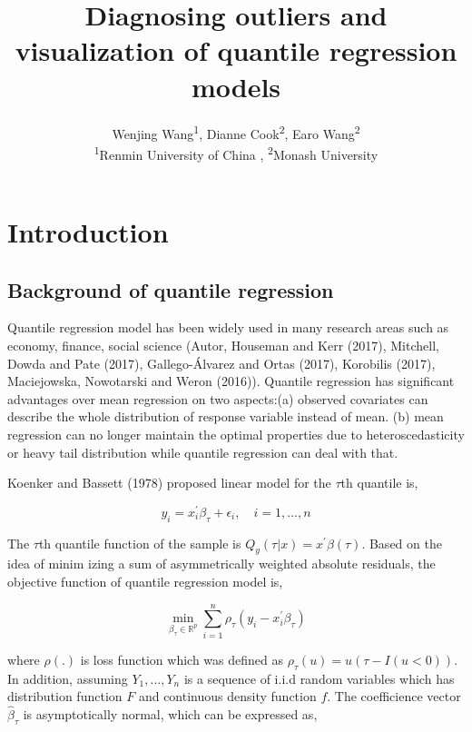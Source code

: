 \documentclass[11pt,a4paper,]{article}
\title{Diagnosing outliers and visualization of quantile regression models}
\author{Wenjing Wang\textsuperscript{1}, Dianne Cook\textsuperscript{2}, Earo
Wang\textsuperscript{2} \\ \textsuperscript{1}Renmin University of China ,
\textsuperscript{2}Monash University}
\date{}
\theoremstyle{definition}
\theoremstyle{definition}
\theoremstyle{remark}
\begin{document}
\maketitle

{
\setcounter{tocdepth}{2}
\tableofcontents
}
\section{Introduction}\label{introduction}

\subsection{Background of quantile
regression}\label{background-of-quantile-regression}

Quantile regression model has been widely used in many research areas
such as economy, finance, social science (Autor, Houseman and Kerr
(2017), Mitchell, Dowda and Pate (2017), Gallego-Álvarez and Ortas
(2017), Korobilis (2017), Maciejowska, Nowotarski and Weron (2016)).
Quantile regression has significant advantages over mean regression on
two aspects:(a) observed covariates can describe the whole distribution
of response variable instead of mean. (b) mean regression can no longer
maintain the optimal properties due to heteroscedasticity or heavy tail
distribution while quantile regression can deal with that.

Koenker and Bassett (1978) proposed linear model for the \(\tau\)th
quantile is,

\begin{equation}
y_i=x^{'}_{i}\beta_{\tau}+\epsilon_{i}, \quad i=1,...,n
\label{eq:linear_qr}
\end{equation}

The \(\tau\)th quantile function of the sample is
\(Q_{y}(\tau|x)=x^{'}\beta(\tau)\). Based on the idea of minim izing a
sum of asymmetrically weighted absolute residuals, the objective
function of quantile regression model is,

\begin{equation}
\min_{\beta_{\tau} \in \mathbb{R}^{p}}\sum_{i=1}^{n} \rho_{\tau}(y_i-x_{i}^{'}\beta_{\tau})
\label{eq:object_function}
\end{equation}

where \(\rho(.)\) is loss function which was defined as
\(\rho_{\tau}(u)=u(\tau-I(u <0))\). In addition, assuming
\(Y_1,...,Y_n\) is a sequence of i.i.d random variables which has
distribution function \(F\) and continuous density function \(f\). The
coefficience vector \(\hat{\beta}_{\tau}\) is asymptotically normal,
which can be expressed as,
\end{document}
